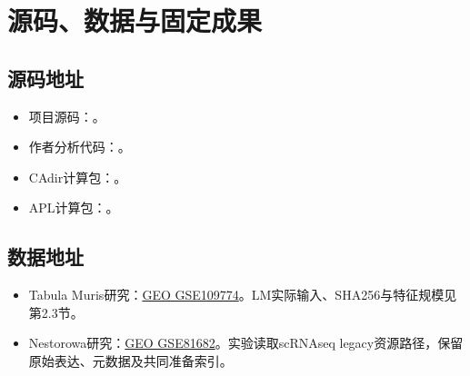 \clearpage\onecolumn\appendix
\section{源码、数据与固定成果}
\subsection{源码地址}
\begin{itemize}
\item 项目源码：\href{https://github.com/Yang2Krown/cadir-research-training}{\texttt{\fontsize{10}{12}\selectfont{}}}。

\item 作者分析代码：\href{https://github.com/VingronLab/CAdir_results/tree/c15b49578bde38b42fd5db2c9830c10dd441ee4c}{\texttt{\fontsize{10}{12}\selectfont{}}}。

\item CAdir计算包：\href{https://github.com/VingronLab/CAdir/tree/de74a008dfcd0d4fa4f7f93c57aa346892a8d935}{\texttt{\fontsize{10}{12}\selectfont{}}}。

\item APL计算包：\href{https://github.com/VingronLab/APL/tree/d4d1f40d9ea9f1d9a95b224d45de843334cd617d}{\texttt{\fontsize{10}{12}\selectfont{}}}。

\end{itemize}
\subsection{数据地址}
\begin{itemize}
\item Tabula Muris研究：\href{https://www.ncbi.nlm.nih.gov/geo/query/acc.cgi?acc=GSE109774}{GEO GSE109774}。LM实际输入、SHA256与特征规模见第\allowbreak{}2.3节。

\item Nestorowa研究：\href{https://www.ncbi.nlm.nih.gov/geo/query/acc.cgi?acc=GSE81682}{GEO GSE81682}。实验读取scRNAseq legacy资源路径，保留原始表达、元数据及共同准备索引。

\end{itemize}
